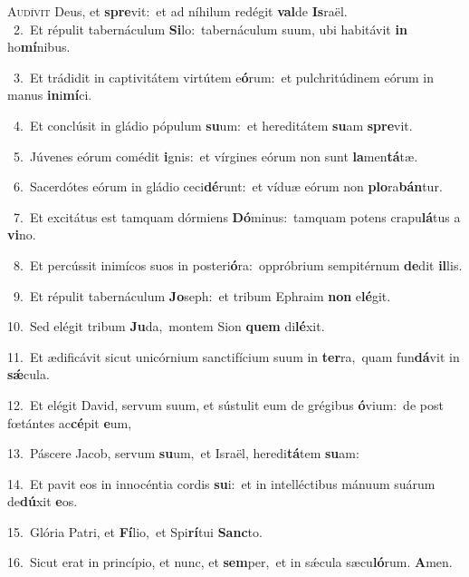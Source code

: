 \lettrine{\initial\textcolor{\initialcolor}{A}}{udívit} Deus, et \textbf{spre}\-vit:~\star et ad níhilum redégit \textbf{val}\-de \textbf{Is}\-raël.\\
{\numbfont\textcolor{\numbcolor}{~2.}}~Et répulit tabernáculum \textbf{Si}\-lo:~\star tabernáculum suum, ubi habitávit \textbf{in} ho\-\textbf{mí}\-nibus.\par
{\numbfont\textcolor{\numbcolor}{~3.}}~Et trádidit in captivitátem virtútem e\-\textbf{ó}\-rum:~\star et pulchritúdinem eórum in manus \textbf{in}\-i\-\textbf{mí}\-ci.\par
{\numbfont\textcolor{\numbcolor}{~4.}}~Et conclúsit in gládio pópulum \textbf{su}\-um:~\star et hereditátem \textbf{su}\-am \textbf{spre}\-vit.\par
{\numbfont\textcolor{\numbcolor}{~5.}}~Júvenes eórum comédit \textbf{i}\-gnis:~\star et vírgines eórum non sunt \textbf{la}\-men\-\textbf{tá}\-tæ.\par
{\numbfont\textcolor{\numbcolor}{~6.}}~Sacerdótes eórum in gládio ceci\-\textbf{dé}\-runt:~\star et víduæ eórum non \textbf{plo}\-ra\-\textbf{bán}\-tur.\par
{\numbfont\textcolor{\numbcolor}{~7.}}~Et excitátus est tamquam dórmiens \textbf{Dó}\-minus:~\star tamquam potens crapu\-\textbf{lá}\-tus a \textbf{vi}\-no.\par
{\numbfont\textcolor{\numbcolor}{~8.}}~Et percússit inimícos suos in posteri\-\textbf{ó}\-ra:~\star oppróbrium sempitérnum \textbf{de}\-dit \textbf{il}\-lis.\par
{\numbfont\textcolor{\numbcolor}{~9.}}~Et répulit tabernáculum \textbf{Jo}\-seph:~\star et tribum Ephraim \textbf{non} e\-\textbf{lé}\-git.\par
{\numbfont\textcolor{\numbcolor}{10.}}~Sed elégit tribum \textbf{Ju}\-da,~\star montem Sion \textbf{quem} di\-\textbf{lé}\-xit.\par
{\numbfont\textcolor{\numbcolor}{11.}}~Et ædificávit sicut unicórnium sanctifícium suum in \textbf{ter}\-ra,~\star quam fun\-\textbf{dá}\-vit in \textbf{sǽ}\-cula.\par
{\numbfont\textcolor{\numbcolor}{12.}}~Et elégit David, servum suum, et sústulit eum de grégibus \textbf{ó}\-vium:~\star de post fœtántes ac\-\textbf{cé}\-pit \textbf{e}\-um,\par
{\numbfont\textcolor{\numbcolor}{13.}}~Páscere Jacob, servum \textbf{su}\-um,~\star et Israël, heredi\-\textbf{tá}\-tem \textbf{su}\-am:\par
{\numbfont\textcolor{\numbcolor}{14.}}~Et pavit eos in innocéntia cordis \textbf{su}\-i:~\star et in intelléctibus mánuum suárum de\-\textbf{dú}\-xit \textbf{e}\-os.\par
{\numbfont\textcolor{\numbcolor}{15.}}~Glória Patri, et \textbf{Fí}\-lio,~\star et Spi\-\textbf{rí}\-tui \textbf{Sanc}\-to.\par
{\numbfont\textcolor{\numbcolor}{16.}}~Sicut erat in princípio, et nunc, et \textbf{sem}\-per,~\star et in sǽcula sæcu\-\textbf{ló}\-rum. \textbf{A}\-men.\par
